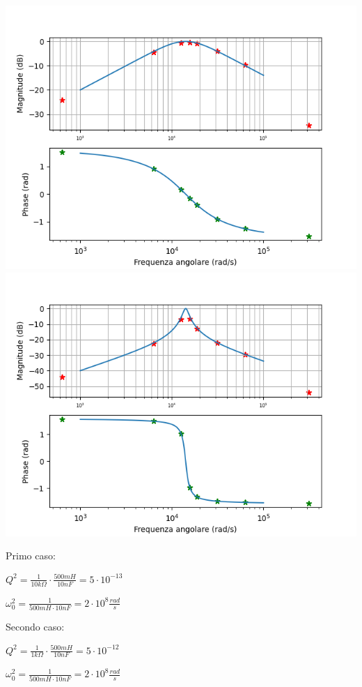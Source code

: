     \begin{minipage}{.625\linewidth}
        \includegraphics[width = 10.5 cm]{bode.png}
        \includegraphics[width = 10.5 cm]{bode2.png}
    \end{minipage}
    \begin{minipage}{.4\linewidth}
        Primo caso:\par
        $Q^2=\frac{1}{10k\Omega} \cdot \frac{500mH}{10nF} = 5\cdot10^{-13}$ \par
        $\omega_0^2 = \frac{1}{500mH\cdot 10nF} = 2 \cdot 10^{8} \frac{rad}{s}$
        \\ \par
        Secondo caso:\par
        $Q^2=\frac{1}{1k\Omega} \cdot \frac{500mH}{10nF} = 5\cdot10^{-12}$ \par
        $\omega_0^2 = \frac{1}{500mH \cdot 10nF} = 2\cdot 10^{8} \frac{rad}{s}$ 
    \end{minipage}


